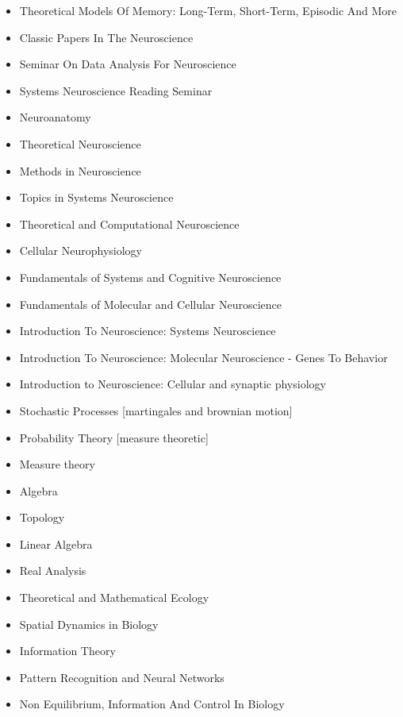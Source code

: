 
\begin{itemize}
\item Theoretical Models Of Memory: Long-Term, Short-Term, Episodic And More
\item Classic Papers In The Neuroscience
\item Seminar On Data Analysis For Neuroscience
\item Systems Neuroscience Reading Seminar
\item Neuroanatomy	
\item Theoretical Neuroscience	
\item Methods in Neuroscience	


\item Topics in Systems Neuroscience
\item Theoretical and Computational Neuroscience
\item Cellular Neurophysiology

\item Fundamentals of Systems and Cognitive Neuroscience
\item Fundamentals of Molecular and Cellular Neuroscience

\item Introduction To Neuroscience: Systems Neuroscience
\item Introduction To Neuroscience: Molecular Neuroscience - Genes To Behavior
\item Introduction to Neuroscience: Cellular and synaptic physiology	


\end{itemize}

\begin{itemize}
\item Stochastic Processes {\small[martingales and brownian motion]}
\item Probability Theory {\small[measure theoretic]}
\item Measure theory
\item Algebra
\item Topology
\item Linear Algebra
\item Real Analysis
\end{itemize}

\begin{itemize}
\item Theoretical and Mathematical Ecology
\item Spatial Dynamics in Biology
\item Information Theory
\item Pattern Recognition and Neural Networks
\item Non Equilibrium, Information And Control In Biology
\end{itemize}

%
%
